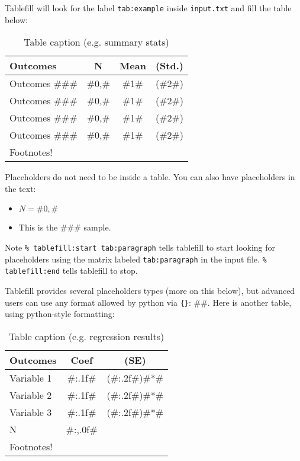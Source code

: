 \documentclass{article}
\begin{document}
Tablefill will look for the label \verb'tab:example' inside
\verb'input.txt' and fill the table below:

\begin{table}
  \caption{Table caption (e.g. summary stats)}
  \label{tab:example} %
  \begin{tabular}{p{4.25cm}ccc}
    \toprule
    Outcomes
    & N
    & Mean
    & (Std.)
    \\\midrule
    Outcomes \#\#\# & \#0,\# & \#1\# & (\#2\#) \\
    Outcomes \#\#\# & \#0,\# & \#1\# & (\#2\#) \\
    Outcomes \#\#\# & \#0,\# & \#1\# & (\#2\#) \\
    Outcomes \#\#\# & \#0,\# & \#1\# & (\#2\#) \\
    \bottomrule
    \multicolumn{4}{p{5cm}}{\footnotesize Footnotes!}
  \end{tabular}
\end{table}

Placeholders do not need to be inside a table. You can also have
placeholders in the text:
\begin{itemize}
    \item $N = \#0,\#$
    \item This is the \#\#\# sample.
\end{itemize}

Note \verb'% tablefill:start tab:paragraph' tells tablefill to start
looking for placeholders using the matrix labeled \verb'tab:paragraph'
in the input file. \verb'% tablefill:end' tells tablefill to stop.

Tablefill provides several placeholders types (more on this below),
but advanced users can use any format allowed by python via \verb'{}':
\#{}\#. Here is another table, using python-style formatting:

\begin{table}
  \caption{Table caption (e.g. regression results)}
  \label{tab:anotherExample} %
  \begin{tabular}{p{4.25cm}cc}
    \toprule
    Outcomes
    & Coef
    & (SE)
    \\\midrule
    Variable 1 & \#{:.1f}\# & (\#{:.2f}\#)\#*\# \\
    Variable 2 & \#{:.1f}\# & (\#{:.2f}\#)\#*\# \\
    Variable 3 & \#{:.1f}\# & (\#{:.2f}\#)\#*\# \\
             N & \#{:,.0f}\#
    \\\midrule
    \bottomrule
    \multicolumn{3}{p{5cm}}{\footnotesize Footnotes!}
  \end{tabular}
\end{table}
\end{document}
